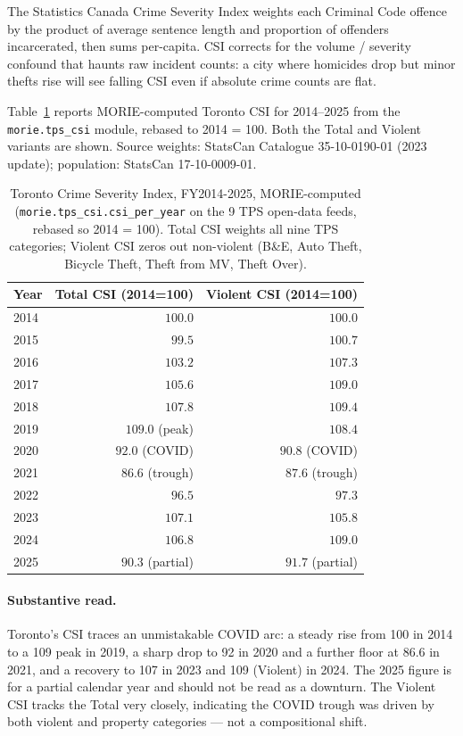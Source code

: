 \documentclass[article,shortnames,nojss]{jss}
\begin{document}
The Statistics Canada Crime Severity Index
\citep{Wallace2009CSI} weights each Criminal Code offence by the
product of average sentence length and proportion of offenders
incarcerated, then sums per-capita.  CSI corrects for the volume /
severity confound that haunts raw incident counts: a city where
homicides drop but minor thefts rise will see falling CSI even if
absolute crime counts are flat.

Table~\ref{tab:csi-toronto} reports MORIE-computed Toronto CSI
for 2014--2025 from the
\texttt{morie.tps\_csi} module, rebased to 2014 = 100.  Both
the Total and Violent variants are shown.  Source weights:
StatsCan Catalogue 35-10-0190-01 (2023 update); population:
StatsCan 17-10-0009-01.

\begin{table}[h]
\centering\footnotesize
\caption{Toronto Crime Severity Index, FY2014-2025, MORIE-computed
(\texttt{morie.tps\_csi.csi\_per\_year} on the 9 TPS open-data
feeds, rebased so 2014 = 100).  Total CSI weights all nine TPS
categories; Violent CSI zeros out non-violent (B\&E, Auto Theft,
Bicycle Theft, Theft from MV, Theft Over).
}\label{tab:csi-toronto}
\begin{tabular}{lrr}
\toprule
Year & Total CSI (2014=100) & Violent CSI (2014=100)\\\midrule
2014 & $100.0$ & $100.0$\\
2015 & $\phantom{0}99.5$ & $100.7$\\
2016 & $103.2$ & $107.3$\\
2017 & $105.6$ & $109.0$\\
2018 & $107.8$ & $109.4$\\
2019 & $\mathbf{109.0}$ (peak) & $108.4$\\
2020 & $\phantom{0}92.0$ (COVID) & $\phantom{0}90.8$ (COVID)\\
2021 & $\phantom{0}86.6$ (trough) & $\phantom{0}87.6$ (trough)\\
2022 & $\phantom{0}96.5$ & $\phantom{0}97.3$\\
2023 & $107.1$ & $105.8$\\
2024 & $106.8$ & $\mathbf{109.0}$\\
2025 & $\phantom{0}90.3$ (partial) & $\phantom{0}91.7$ (partial)\\
\bottomrule
\end{tabular}
\end{table}

\paragraph{Substantive read.}  Toronto's CSI traces an unmistakable
COVID arc: a steady rise from 100 in 2014 to a 109 peak in 2019,
a sharp drop to 92 in 2020 and a further floor at 86.6 in 2021,
and a recovery to 107 in 2023 and 109 (Violent) in 2024.  The
2025 figure is for a partial calendar year and should not be
read as a downturn.  The Violent CSI tracks the Total very
closely, indicating the COVID trough was driven by both violent
and property categories --- not a compositional shift.
\end{document}
